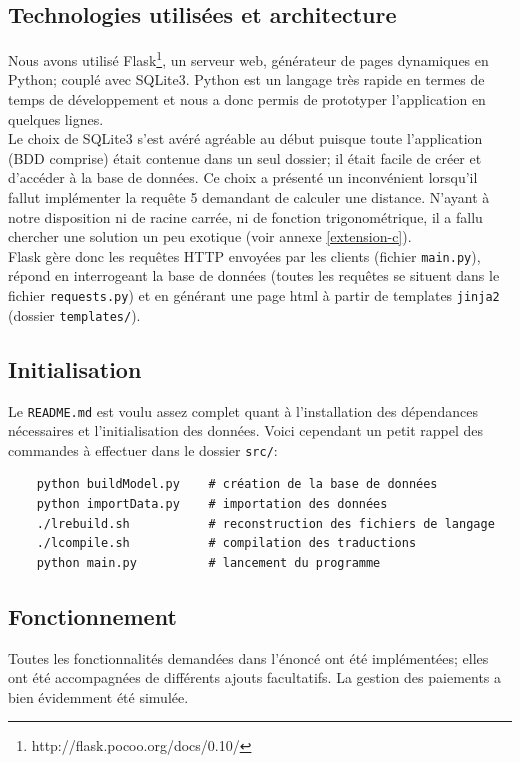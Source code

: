 \documentclass[a4paper]{article}
\begin{document}
  	\subsection{Technologies utilisées et architecture}
	Nous avons utilisé Flask\footnote{http://flask.pocoo.org/docs/0.10/}, un serveur web, générateur de pages dynamiques en Python; couplé avec SQLite3. Python est un langage très rapide en termes de temps de développement et nous a donc permis de prototyper l'application en quelques lignes.\\
    
    Le choix de SQLite3 s'est avéré agréable au début puisque toute l'application (BDD comprise) était contenue dans un seul dossier; il était facile de créer et d'accéder à la base de données. Ce choix a présenté un inconvénient lorsqu'il fallut implémenter la requête 5 demandant de calculer une distance. N'ayant à notre disposition ni de racine carrée, ni de fonction trigonométrique, il a fallu chercher une solution un peu exotique (voir annexe \ref{extension-c}).\\
    
    Flask gère donc les requêtes HTTP envoyées par les clients (fichier \texttt{main.py}), répond en interrogeant la base de données (toutes les requêtes se situent dans le fichier \texttt{requests.py}) et en générant une page html à partir de templates \texttt{jinja2} (dossier \texttt{templates/}).
    
    \subsection{Initialisation}
    Le \texttt{README.md} est voulu assez complet quant à l'installation des dépendances nécessaires et l'initialisation des données. Voici cependant un petit rappel des commandes à effectuer dans le dossier \texttt{src/}:
    
    \begin{verbatim}
    python buildModel.py    # création de la base de données
    python importData.py    # importation des données
    ./lrebuild.sh           # reconstruction des fichiers de langage
    ./lcompile.sh           # compilation des traductions
    python main.py			# lancement du programme
	\end{verbatim}
    
    \subsection{Fonctionnement}
    Toutes les fonctionnalités demandées dans l'énoncé ont été implémentées; elles ont été accompagnées de différents ajouts facultatifs. La gestion des paiements a bien évidemment été simulée.
    
\end{document}
